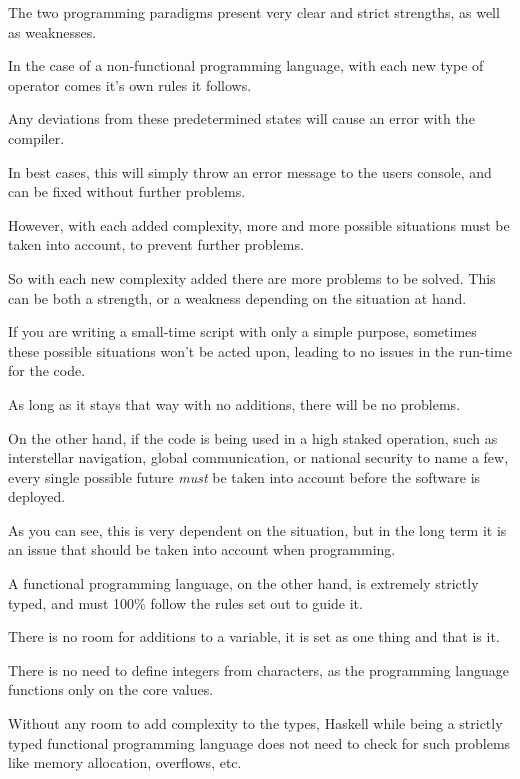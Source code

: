 \documentclass{article}
\begin{document}
The two programming paradigms present very clear and strict strengths, as well as weaknesses. 

\medskip\noindent
In the case of a non-functional programming language, with each new type of operator comes it's own rules it follows. 

\medskip\noindent
Any deviations from these predetermined states will cause an error with the compiler.  

\medskip\noindent
In best cases, this will simply throw an error message to the users console, and can be fixed without further problems. 

\medskip\noindent
However, with each added complexity, more and more possible situations must be taken into account, to prevent further problems.  

\medskip\noindent
So with each new complexity added there are more problems to be solved. This can be both a strength, or a weakness depending on the situation at hand.  

\medskip\noindent
If you are writing a small-time script with only a simple purpose, sometimes these possible situations won't be acted upon, leading to no issues in the run-time for the code. 

\medskip\noindent
As long as it stays that way with no additions, there will be no problems. 

\medskip\noindent
On the other hand, if the code is being used in a high staked operation, such as interstellar navigation, global communication, or national security to name a few, every single possible future \textit{must} be taken into account before the software is deployed. 

\medskip\noindent
As you can see, this is very dependent on the situation, but in the long term it is an issue that should be taken into account when programming.

\medskip\noindent
A functional programming language, on the other hand, is extremely strictly typed, and must 100\% follow the rules set out to guide it. 

\medskip\noindent
There is no room for additions to a variable, it is set as one thing and that is it. 

\medskip\noindent
There is no need to define integers from characters, as the programming language functions only on the core values. 

\medskip\noindent
Without any room to add complexity to the types, Haskell while being a strictly typed functional programming language does not need to check for such problems like memory allocation, overflows, etc. 
\end{document}
